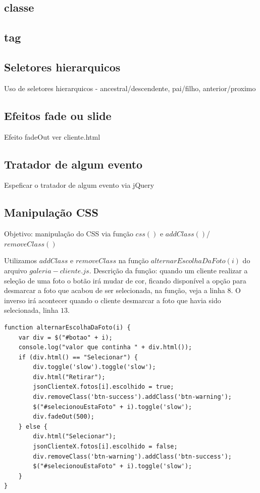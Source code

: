 \subsection{classe}


\subsection{tag}



\subsection{Seletores hierarquicos}
Uso de seletores hierarquicos - ancestral/descendente, pai/filho, anterior/proximo
\subsection{Efeitos fade ou slide}

Efeito fadeOut ver cliente.html


\subsection{Tratador de algum evento}
Espeficar o tratador de algum evento via jQuery
\subsection{Manipulação CSS}
	Objetivo: manipulação do CSS via função $css()$ e $addClass()$/$removeClass()$

	Utilizamos $addClass$ e $removeClass$ na função $alternarEscolhaDaFoto(i)$ do arquivo $galeria-cliente.js$. 
	Descrição da função: quando um cliente realizar a seleção de uma foto o botão irá mudar de cor, ficando disponível a opção para desmarcar a foto que acabou de ser selecionada, na função, veja a linha $8$. O inverso irá acontecer quando o cliente desmarcar a foto que havia sido selecionada, linha $13$.
	

\begin{lstlisting}
function alternarEscolhaDaFoto(i) {
    var div = $("#botao" + i);
    console.log("valor que continha " + div.html());
    if (div.html() == "Selecionar") {
        div.toggle('slow').toggle('slow');
        div.html("Retirar");
        jsonClienteX.fotos[i].escolhido = true;
        div.removeClass('btn-success').addClass('btn-warning');
        $("#selecionouEstaFoto" + i).toggle('slow');
        div.fadeOut(500);
    } else {
        div.html("Selecionar");
        jsonClienteX.fotos[i].escolhido = false;
        div.removeClass('btn-warning').addClass('btn-success');
        $("#selecionouEstaFoto" + i).toggle('slow');
    }
}
\end{lstlisting}

